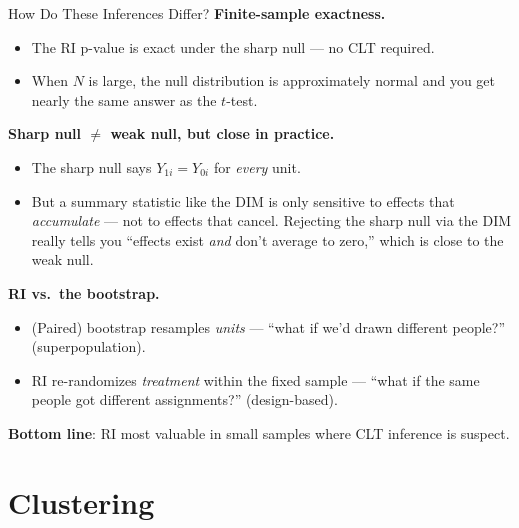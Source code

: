 \documentclass[xcolor=dvipsnames]{beamer}
\begin{document}
\begin{frame}{How Do These Inferences Differ?}
\small
{} \textbf{Finite-sample exactness.}\\
\footnotesize
\begin{itemize}
\item The RI p-value is exact under the sharp null --- no CLT required.
\item When $N$ is large, the null distribution is approximately normal and you get nearly the same answer as the $t$-test.
\end{itemize}

\medskip
{} \small\textbf{Sharp null $\neq$ weak null, but close in practice.}\\
\footnotesize
\begin{itemize}
\item The sharp null says $Y_{1i}=Y_{0i}$ for \textit{every} unit.
\item But a summary statistic like the DIM is only sensitive to effects that \textit{accumulate} --- not to effects that cancel.  Rejecting the sharp null via the DIM really tells you ``effects exist \textit{and} don't average to zero,'' which is close to the weak null.
\end{itemize}

\medskip
{} \small\textbf{RI vs.\ the bootstrap.}\\
\footnotesize
\begin{itemize}
\item (Paired) bootstrap resamples \textit{units} --- ``what if we'd drawn different people?'' (superpopulation).
\item RI re-randomizes \textit{treatment} within the fixed sample --- ``what if the same people got different assignments?'' (design-based).
\end{itemize}

\medskip
{} \small \textbf{Bottom line}: RI most valuable in \alert{small samples} where CLT inference is suspect.
\end{frame}


\section{Clustering}
\end{document}
